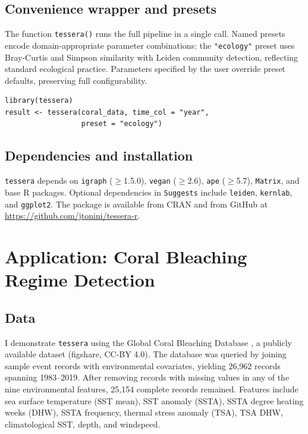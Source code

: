 \documentclass[12pt]{article}
\begin{document}
\subsection{Convenience wrapper and presets}

The function \texttt{tessera()} runs the full pipeline in a single call. Named presets encode domain-appropriate parameter combinations: the \texttt{"ecology"} preset uses Bray-Curtis and Simpson similarity with Leiden community detection, reflecting standard ecological practice. Parameters specified by the user override preset defaults, preserving full configurability.

\begin{verbatim}
library(tessera)
result <- tessera(coral_data, time_col = "year",
                  preset = "ecology")
\end{verbatim}

\subsection{Dependencies and installation}

\texttt{tessera} depends on \texttt{igraph} ($\geq$1.5.0), \texttt{vegan} ($\geq$2.6), \texttt{ape} ($\geq$5.7), \texttt{Matrix}, and base R packages. Optional dependencies in \texttt{Suggests} include \texttt{leiden}, \texttt{kernlab}, and \texttt{ggplot2}. The package is available from CRAN and from GitHub at \url{https://github.com/jtonini/tessera-r}.


\section{Application: Coral Bleaching Regime Detection}

\subsection{Data}

I demonstrate \texttt{tessera} using the Global Coral Bleaching Database \citep{vanWoesik2022}, a publicly available dataset (figshare, CC-BY 4.0). The database was queried by joining sample event records with environmental covariates, yielding 26,962 records spanning 1983--2019. After removing records with missing values in any of the nine environmental features, 25,154 complete records remained. Features include sea surface temperature (SST mean), SST anomaly (SSTA), SSTA degree heating weeks (DHW), SSTA frequency, thermal stress anomaly (TSA), TSA DHW, climatological SST, depth, and windspeed.
\end{document}
